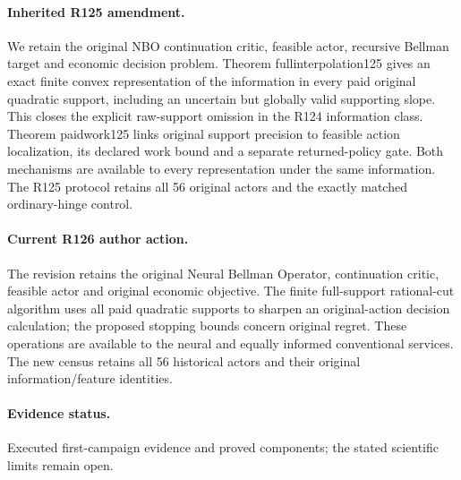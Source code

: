 \paragraph{Inherited R125 amendment.} We retain the original NBO continuation critic, feasible actor, recursive Bellman target and economic decision problem. Theorem fullinterpolation125 gives an exact finite convex representation of the information in every paid original quadratic support, including an uncertain but globally valid supporting slope. This closes the explicit raw-support omission in the R124 information class. Theorem paidwork125 links original support precision to feasible action localization, its declared work bound and a separate returned-policy gate. Both mechanisms are available to every representation under the same information. The R125 protocol retains all 56 original actors and the exactly matched ordinary-hinge control.

\paragraph{Current R126 author action.} The revision retains the original Neural Bellman Operator, continuation critic, feasible actor and original economic objective. The finite full-support rational-cut algorithm uses all paid quadratic supports to sharpen an original-action decision calculation; the proposed stopping bounds concern original regret. These operations are available to the neural and equally informed conventional services. The new census retains all 56 historical actors and their original information/feature identities.

\paragraph{Evidence status.} Executed first-campaign evidence and proved components; the stated scientific limits remain open.


